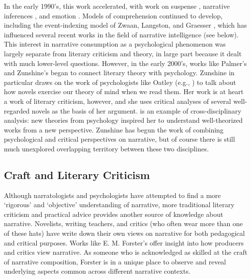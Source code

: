 In the early 1990's, this work accelerated, with work on suspense \citep{Gerrig1994}, narrative inferences \citep{Graesser1994}, and emotion \citep{Oatley1995}.
%
Models of comprehension continued to develop, including the event-indexing model of Zwaan, Langston, and Graesser \citep{Zwaan1995}, which has influenced several recent works in the field of narrative intelligence (see below).
%
This interest in narrative consumption as a psychological phenomenon was largely separate from literary criticism and theory, in large part because it dealt with much lower-level questions.
%
However, in the early 2000's, works like Palmer's  \citep{Palmer2004} and Zunshine's  \citep{Zunshine2006} began to connect literary theory with psychology.
%
Zunshine in particular draws on the work of psychologists like Oatley (e.g., \citep{Oatley1999}) to talk about how novels exercise our theory of mind when we read them.
%
Her work is at heart a work of literary criticism, however, and she uses critical analyses of several well-regarded novels as the basis of her argument.
%
 is an example of cross-disciplinary analysis: new theories from psychology inspired her to understand well-theorized works from a new perspective.
%
Zunshine has begun the work of combining psychological and critical perspectives on narrative, but of course there is still much unexplored overlapping territory between these two disciplines.


\subsection{Craft and Literary Criticism}

Although narratologists and psychologists have attempted to find a more `rigorous' and `objective' understanding of narrative, more traditional literary criticism and practical advice provides another source of knowledge about narrative.
%
Novelists, writing teachers, and critics (who often wear more than one of these hats) have write down their own views on narrative for both pedagogical and critical purposes.
%
Works like E. M. Forster's  \citep{Forster1927} offer insight into how producers and critics view narrative.
%
As someone who is acknowledged as skilled at the craft of narrative composition, Forster is in a unique place to observe and reveal underlying aspects common across different narrative contexts.


